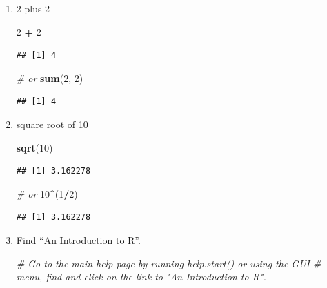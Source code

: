 \documentclass[
]{book}
\newenvironment{Shaded}{\begin{snugshade}}{\end{snugshade}}
\newcommand{\CommentTok}[1]{\textcolor[rgb]{0.56,0.35,0.01}{\textit{#1}}}
\newcommand{\DecValTok}[1]{\textcolor[rgb]{0.00,0.00,0.81}{#1}}
\newcommand{\KeywordTok}[1]{\textcolor[rgb]{0.13,0.29,0.53}{\textbf{#1}}}
\newcommand{\NormalTok}[1]{#1}
\newcommand{\OperatorTok}[1]{\textcolor[rgb]{0.81,0.36,0.00}{\textbf{#1}}}
\newcommand{\StringTok}[1]{\textcolor[rgb]{0.31,0.60,0.02}{#1}}
\begin{document}
\begin{alert}

\begin{enumerate}
\def\labelenumi{\arabic{enumi}.}
\item
  2 plus 2

\begin{Shaded}
\begin{Highlighting}[]
\DecValTok{2} \OperatorTok{+}\StringTok{ }\DecValTok{2}
\end{Highlighting}
\end{Shaded}

\begin{verbatim}
## [1] 4
\end{verbatim}

\begin{Shaded}
\begin{Highlighting}[]
\CommentTok{\# or}
\KeywordTok{sum}\NormalTok{(}\DecValTok{2}\NormalTok{, }\DecValTok{2}\NormalTok{)}
\end{Highlighting}
\end{Shaded}

\begin{verbatim}
## [1] 4
\end{verbatim}
\item
  square root of 10

\begin{Shaded}
\begin{Highlighting}[]
\KeywordTok{sqrt}\NormalTok{(}\DecValTok{10}\NormalTok{)}
\end{Highlighting}
\end{Shaded}

\begin{verbatim}
## [1] 3.162278
\end{verbatim}

\begin{Shaded}
\begin{Highlighting}[]
\CommentTok{\# or}
\DecValTok{10}\OperatorTok{\^{}}\NormalTok{(}\DecValTok{1}\OperatorTok{/}\DecValTok{2}\NormalTok{)}
\end{Highlighting}
\end{Shaded}

\begin{verbatim}
## [1] 3.162278
\end{verbatim}
\item
  Find ``An Introduction to R''.

\begin{Shaded}
\begin{Highlighting}[]
\CommentTok{\# Go to the main help page by running \textquotesingle{}help.start() or using the GUI}
\CommentTok{\# menu, find and click on the link to "An Introduction to R".}
\end{Highlighting}
\end{Shaded}
\end{enumerate}

\end{alert}
\end{document}
